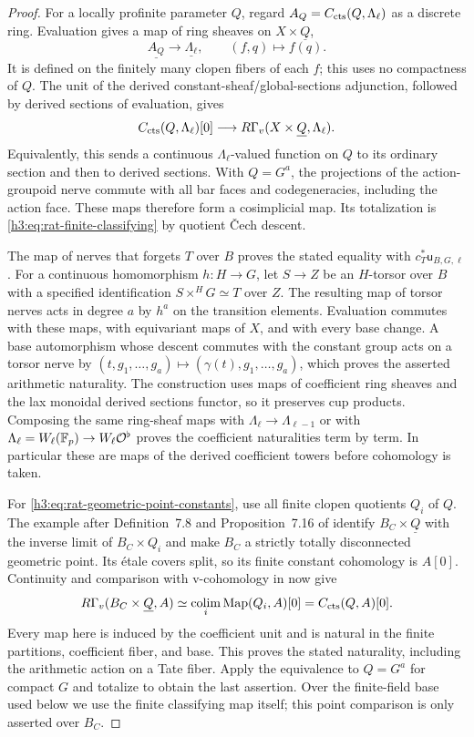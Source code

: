 \begin{proof}
For a locally profinite parameter $Q$, regard
$A_Q=C_{\mathrm{cts}}(Q,\Lambda_\ell)$ as a discrete ring.  Evaluation
gives a map of ring sheaves on $X\times\underline Q$,
\[
 \underline{A_Q}\longrightarrow\underline{\Lambda_\ell},
 \qquad (f,q)\longmapsto f(q).
\]
It is defined on the finitely many clopen fibers of each $f$; this
uses no compactness of $Q$.  The unit of the derived
constant-sheaf/global-sections adjunction, followed by derived
sections of evaluation, gives
\[
 C_{\mathrm{cts}}(Q,\Lambda_\ell)[0]
       \longrightarrow R\Gamma_v(X\times\underline Q,\Lambda_\ell).
\]
Equivalently, this sends a continuous $\Lambda_\ell$-valued function
on $Q$ to its ordinary section and then to derived sections.  With $Q=G^a$, the
projections of the action-groupoid nerve commute with all bar faces
and codegeneracies, including the action face.  These maps therefore
form a cosimplicial map.  Its totalization is
\eqref{h3:eq:rat-finite-classifying} by quotient \v{C}ech descent.

The map of nerves that forgets $T$ over $B$ proves the stated equality
with $c_T^*\mathsf u_{B,G,\ell}$.  For a continuous homomorphism
$h:H\to G$, let $S\to Z$ be an $H$-torsor over $B$ with a specified
identification $S\times^H G\simeq T$ over $Z$.  The resulting map of
torsor nerves acts in degree $a$ by $h^a$ on the transition elements.  Evaluation commutes with these maps, with equivariant
maps of $X$, and with every base change.  A base automorphism whose
descent commutes with the constant group acts on a torsor nerve by
$(t,g_1,\ldots,g_a)\mapsto(\gamma(t),g_1,\ldots,g_a)$, which proves
the asserted arithmetic naturality.  The construction uses maps of
coefficient ring sheaves and the lax monoidal derived sections functor,
so it preserves cup products.  Composing the same ring-sheaf maps
with $\Lambda_\ell\to\Lambda_{\ell-1}$ or with
$\Lambda_\ell=W_\ell(\mathbb F_p)\to W_\ell\mathcal O^\flat$ proves the
coefficient naturalities term by term.  In particular these are maps
of the derived coefficient towers before cohomology is taken.

For \eqref{h3:eq:rat-geometric-point-constants}, use all finite clopen
quotients $Q_i$ of $Q$.  The example after Definition~7.8 and
Proposition~7.16 of \cite{ScholzeDiamonds} identify
$B_C\times\underline Q$ with the inverse limit of $B_C\times Q_i$
and make $B_C$ a strictly totally disconnected geometric point.
Its \'etale covers split, so its finite constant cohomology is $A[0]$.
Continuity and comparison with v-cohomology in
\cite[Propositions~14.9--14.10]{ScholzeDiamonds} now give
\[
 R\Gamma_v(B_C\times\underline Q,A)
   \simeq\operatorname*{colim}_i\operatorname{Map}(Q_i,A)[0]
   =C_{\mathrm{cts}}(Q,A)[0].
\]
Every map here is induced by the coefficient unit and is natural in
the finite partitions, coefficient fiber, and base.  This proves the
stated naturality, including the arithmetic action on a Tate fiber.
Apply the equivalence to $Q=G^a$ for compact $G$ and totalize to obtain
the last assertion.  Over the finite-field base used below we use the
finite classifying map itself; this point comparison is only asserted
over $B_C$.
\end{proof}

